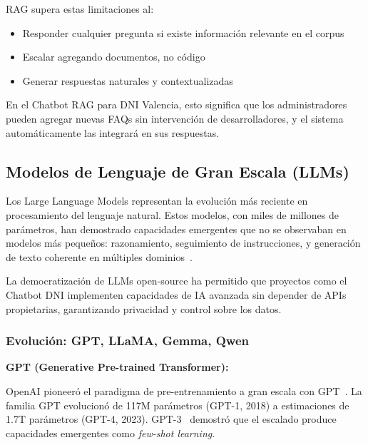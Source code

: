 RAG supera estas limitaciones al:
\begin{itemize}
    \item Responder cualquier pregunta si existe informaci\'on relevante en el corpus
    \item Escalar agregando documentos, no c\'odigo
    \item Generar respuestas naturales y contextualizadas
\end{itemize}

En el Chatbot RAG para DNI Valencia, esto significa que los administradores pueden agregar nuevas FAQs sin intervenci\'on de desarrolladores, y el sistema autom\'aticamente las integrar\'a en sus respuestas.

\subsection{Modelos de Lenguaje de Gran Escala (LLMs)}
\label{subsec:llms}

Los Large Language Models representan la evoluci\'on m\'as reciente en procesamiento del lenguaje natural. Estos modelos, con miles de millones de par\'ametros, han demostrado capacidades emergentes que no se observaban en modelos m\'as peque\~nos: razonamiento, seguimiento de instrucciones, y generaci\'on de texto coherente en m\'ultiples dominios~\cite{brown2020gpt3}.

La democratizaci\'on de LLMs open-source ha permitido que proyectos como el Chatbot DNI implementen capacidades de IA avanzada sin depender de APIs propietarias, garantizando privacidad y control sobre los datos.

\subsubsection{Evoluci\'on: GPT, LLaMA, Gemma, Qwen}
\label{subsubsec:evolucion-llms}

\textbf{GPT (Generative Pre-trained Transformer):}

OpenAI pioneer\'o el paradigma de pre-entrenamiento a gran escala con GPT~\cite{brown2020gpt3}. La familia GPT evolucion\'o de 117M par\'ametros (GPT-1, 2018) a estimaciones de 1.7T par\'ametros (GPT-4, 2023). GPT-3~\cite{brown2020gpt3} demostr\'o que el escalado produce capacidades emergentes como \textit{few-shot learning}.

